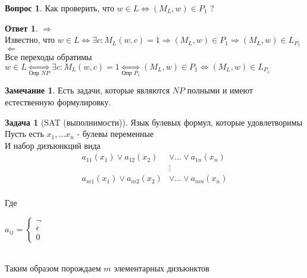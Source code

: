 \documentclass{beamer}
\theoremstyle{plain}
\theoremstyle{definition}
\newtheorem{Q}[thm]{Вопрос}
\newtheorem{prob-rus}[thm]{Задача}
\newtheorem{A}[thm]{Ответ}
\newtheorem{rmk}[thm]{Замечание}
\begin{document}
\begin{frame}
	\begin{Q}
	    Как проверить, что $w \in L \Leftrightarrow (M_L,w) \in P_1$ ?	
	\end{Q}
	\begin{A}
	    $\Rightarrow$ \\
	    Известно, что $w \in L \Leftrightarrow \exists c: M_L(w,c)=1 \Rightarrow (M_L,w) \in P_1 \Rightarrow (M_L,w) \in L_{P_1}$\\
	    $\Leftarrow$ \\
	    Все переходы обратимы \\
	    $w \in L {\underset{\mbox{Опр $NP$}}\Leftrightarrow} \exists c: M_L(w,c)=1 {\underset{\mbox{Опр $P_1$}}\Leftrightarrow} (M_L,w) \in P_1 \Leftrightarrow (M_L,w) \in L_{P_1}$
	\end{A}
\end{frame}

\begin{frame}
	\begin{rmk}
	    Есть задачи, которые являются $NP$ полными и имеют естественную формулировку. 	
	\end{rmk}
\end{frame}

\begin{frame}
	\begin{prob-rus}[SAT (выполнимости)]
	    Язык булевых формул, которые удовлетворимы \\
	    Пусть есть $x_1, \dots x_n$ - булевы переменные \\
	    И набор дизъюнкций вида \\
	    \begin{equation*}
	        \begin{split}
	        	a_{11}(x_1) \vee a_{12}(x_2) & \vee \dots \vee a_{1n}(x_n) \\
	    	    &\vdots \\
	    	    a_{m1}(x_1) \vee a_{m2}(x_2) & \vee \dots \vee a_{mn}(x_n)
	        \end{split}
	    \end{equation*} \\
	    Где \\
	    \begin{center}
	    	$a_{ij} = \begin{cases} \neg & \\ \epsilon & \\ 0 & \end{cases}$
	    \end{center} \\
	    Таким образом порождаем $m$ элементарных дизъюнктов
	\end{prob-rus}
\end{frame}
\end{document}
